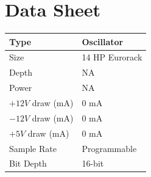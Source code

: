 \documentclass[12pt,letter]{article}
\begin{document}

\clearpage
\section*{Data Sheet}

\begin{table}[!htp]
\begin{tabular}{|l|l|}
\hline
Type             & Oscillator               \\
\hline
Size             & 14 HP Eurorack           \\
\hline
Depth            & NA                       \\
\hline
Power            & NA                       \\ %
\hline
$+12V$ draw (mA) & 0 mA                     \\
\hline
$-12V$ draw (mA) & 0 mA                     \\
\hline
$+5V$ draw (mA)  & 0 mA                     \\
\hline
Sample Rate      & Programmable             \\
\hline
Bit Depth        & 16-bit                   \\
\hline
\end{tabular}
\end{table}


\clearpage
\renewcommand\refname{References \& Acknowledgments}
\nocite{*}


\end{document}
